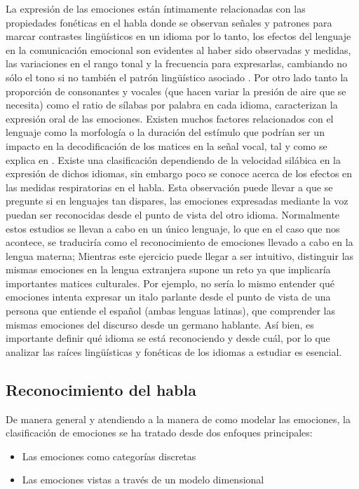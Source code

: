 \documentclass[11pt,a4paper,spanish]{book}
\begin{document}
	La expresión de las emociones están íntimamente relacionadas con las propiedades fonéticas en el habla donde se observan señales y patrones para marcar contrastes lingüísticos en un idioma \cite{Pell2001} por lo tanto, los efectos del lenguaje en la comunicación emocional son evidentes al haber sido observadas y medidas, las variaciones en el rango tonal y la frecuencia para expresarlas, cambiando no sólo el tono si no también el patrón lingüístico asociado \cite{Davletcharova2015}.
	Por otro lado tanto la proporción de consonantes y vocales (que hacen variar la presión de aire que se necesita) como el ratio de sílabas por palabra en cada idioma, caracterizan la expresión oral de las emociones. Existen muchos factores relacionados con el lenguaje como la morfología o la duración del estímulo que podrían ser un impacto en la decodificación de los matices en la señal vocal, tal y como se explica en \cite{Chen2017}.
	Existe una clasificación dependiendo de la velocidad silábica en la expresión de dichos idiomas, sin embargo poco se conoce acerca de los efectos en las medidas respiratorias en el habla. Esta observación puede llevar a que se pregunte si en lenguajes tan dispares, las emociones expresadas mediante la voz puedan ser reconocidas desde el punto de vista del otro idioma.
	Normalmente estos estudios se llevan a cabo en un único lenguaje, lo que en el caso que nos acontece, se traduciría como el reconocimiento de emociones llevado a cabo en la lengua materna; Mientras este ejercicio puede llegar a ser intuitivo, distinguir las mismas emociones en la lengua extranjera supone un reto ya que implicaría importantes matices culturales. Por ejemplo, no sería lo mismo entender qué emociones intenta expresar un italo parlante desde el punto de vista de una persona que entiende el español (ambas lenguas latinas), que comprender las mismas emociones del discurso desde un germano hablante. Así bien, es importante definir qué idioma se está reconociendo y desde cuál, por lo que analizar las raíces lingüísticas y fonéticas de los idiomas a estudiar es esencial. \hfill \break
	
	\subsection{Reconocimiento del habla}
	De manera general y atendiendo a la manera de como modelar las emociones, la clasificación de emociones se ha tratado desde dos enfoques principales:
	\begin{itemize}
		\item Las emociones como categorías discretas
		\item Las emociones vistas a través de un modelo dimensional
	\end{itemize}
\end{document}

